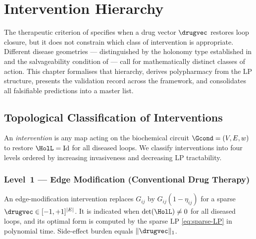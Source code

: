 
\chapter{Intervention Hierarchy}
\label{ch:intervention}

The therapeutic criterion of  specifies when a drug vector
$\drugvec$ restores loop closure, but it does not constrain which class of
intervention is appropriate.  Different disease geometries — distinguished by
the holonomy type established in  and the salvageability
condition of  — call for mathematically distinct
classes of action.  This chapter formalises that hierarchy, derives polypharmacy
from the LP structure, presents the validation record across the framework, and
consolidates all falsifiable predictions into a master list.

\section{Topological Classification of Interventions}
\label{sec:intervention-classes}

\begin{definition}
\label{def:intervention-level}
An \emph{intervention} is any map acting on the biochemical circuit
$\Gcond = (V, E, w)$ to restore $\HolL = \mathrm{Id}$ for all diseased loops.
We classify interventions into four levels ordered by increasing invasiveness
and decreasing LP tractability.
\end{definition}

\subsection{Level~1 — Edge Modification (Conventional Drug Therapy)}

\begin{proposition}
\label{prop:level1}
An edge-modification intervention replaces $G_{ij}$ by $G_{ij}(1-\eta_{ij})$
for a sparse $\drugvec \in [-1,+1]^{|E|}$.  It is indicated when
$\det(\HolL) \neq 0$ for all diseased loops, and its optimal form is
computed by the sparse LP \eqref{eq:sparse-LP} in polynomial time.
Side-effect burden equals $\|\drugvec\|_1$.
\end{proposition}

